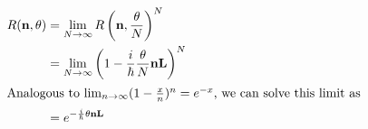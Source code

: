\documentclass[a4paper,german,12pt,smallheadings]{scrartcl}
\begin{document}
\begin{enumerate}[a)]
     \begin{align*}
       R(\mathbf{n}, \theta) &= \lim_{N \to \infty} R\del{\mathbf{n}, \frac{\theta}{N}}^N \\
                             &= \lim_{N \to \infty} \del{1 - \frac{i}{\hbar} \frac{\theta}{N} \mathbf{n} \mathbf{L}}^N \\
       \intertext{Analogous to $\lim_{n \to \infty} (1 - \frac{x}{n})^n = e^{-x}$, we can solve this limit as}
                               &= e^{-\frac{i}{\hbar} \theta \mathbf{n} \mathbf{L}}
     \end{align*}
\end{enumerate}
\end{document}
